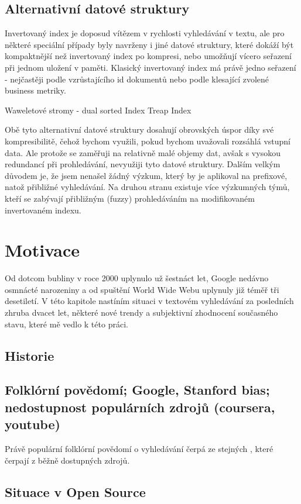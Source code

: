 \documentclass[11pt]{article}
\begin{document}
\subsection{Alternativní datové struktury}
Invertovaný index je doposud vítězem v rychlosti vyhledávání v textu,
ale pro některé speciální případy byly navrženy i jiné datové struktury,
které dokáží být kompaktnější než invertovaný index po kompresi, nebo
umožňují vícero seřazení při jednom uložení v paměti. Klasický
invertovaný index má právě jedno seřazení - nejčastěji podle
vzrůstajícího id dokumentů nebo podle klesající zvolené business
metriky.

Waweletové stromy - dual sorted Index Treap Index

Obě tyto alternativní datové struktury dosahují obrovských úspor díky
své kompresibilitě, čehož bychom využili, pokud bychom uvažovali
rozsáhlá vstupní data. Ale protože se zaměřuji na relativně malé objemy
dat, avšak s vysokou redundancí při prohledávání, nevyužiji tyto datové
struktury. Dalším velkým důvodem je, že jsem nenašel žádný výzkum, který
by je aplikoval na prefixové, natož přibližné vyhledávání. Na druhou
stranu existuje více výzkumných týmů, kteří se zabývají přibližným
(fuzzy) prohledáváním na modifikovaném invertovaném indexu.

\section{Motivace}
Od dotcom bubliny v roce 2000 uplynulo už šestnáct let, Google nedávno
osmnácté narozeniny a od spuštění World Wide Webu uplynuly již téměř tři
desetiletí. V této kapitole nastíním situaci v textovém vyhledávání za
posledních zhruba dvacet let, některé nové trendy a subjektivní
zhodnocení současného stavu, které mě vedlo k této práci.

\subsection{Historie}

\subsection{Folklórní povědomí; Google, Stanford bias; nedostupnost populárních zdrojů (coursera, youtube)}
Právě populární folklórní povědomí o vyhledávání čerpá ze stejných , které čerpají
z běžně dostupných zdrojů.

\subsection{Situace v Open Source}
\end{document}
